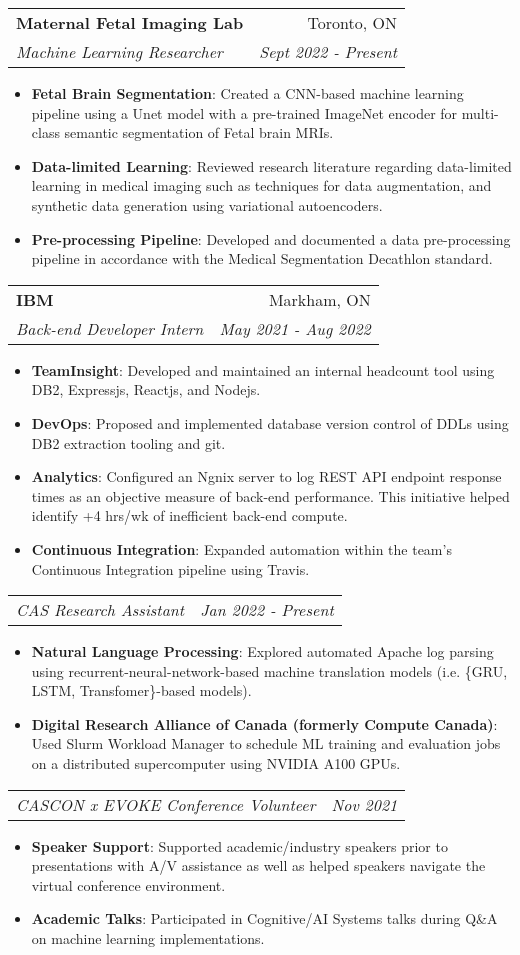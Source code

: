 \documentclass[letterpaper,11pt]{article}
\makeatletter
\newcommand{\resumeItem}[2]{
  \item\small{
    \textbf{#1}{: #2\vspace{-2pt}}
  }
}
\newcommand{\resumeSubheading}[4]{
  \vspace{-1pt}\item
    \begin{tabular*}{0.97\textwidth}[t]{l@{\extracolsep{\fill}}r}
      \textbf{\large#1} & #2 \\
      \textit{\small#3} & \textit{\small #4} \\
    \end{tabular*}\vspace{-5pt}
}
\newcommand{\resumeSubSubheading}[2]{
    \begin{tabular*}{0.97\textwidth}{l@{\extracolsep{\fill}}r}
      \textit{\small#1} & \textit{\small #2} \\
    \end{tabular*}\vspace{-5pt}
}
\newcommand{\resumeItemListStart}{\begin{itemize}}
\newcommand{\resumeItemListEnd}{\end{itemize}\vspace{-5pt}}
\makeatother
\begin{document}
	\resumeSubheading
	{Maternal Fetal Imaging Lab}{Toronto, ON}
	{Machine Learning Researcher}{Sept 2022 - Present}
	\resumeItemListStart
	\resumeItem{Fetal Brain Segmentation}
	{Created a CNN-based machine learning pipeline using a Unet model with a pre-trained ImageNet encoder for multi-class semantic segmentation of Fetal brain MRIs.}
	\resumeItem{Data-limited Learning}
	{Reviewed research literature regarding data-limited learning in medical imaging such as techniques for data augmentation, and synthetic data generation using variational autoencoders.}
	\resumeItem{Pre-processing Pipeline}
	{Developed and documented a data pre-processing pipeline in accordance with the Medical Segmentation Decathlon standard.}
	\resumeItemListEnd
	
    \resumeSubheading
      {IBM}{Markham, ON}
      {Back-end Developer Intern}{May 2021 - Aug 2022}
      \resumeItemListStart
        \resumeItem{TeamInsight}
          {Developed and maintained an internal headcount tool using DB2, Expressjs, Reactjs, and Nodejs.}
        \resumeItem{DevOps}
          {Proposed and implemented database version control of DDLs using DB2 extraction tooling and git.}
        \resumeItem{Analytics}
          {Configured an Ngnix server to log REST API endpoint response times as an objective measure of back-end performance. This initiative helped identify +4 hrs/wk of inefficient back-end compute.}
      	\resumeItem{Continuous Integration}
     	  {Expanded automation within the team's Continuous Integration pipeline using Travis.}
      \resumeItemListEnd
      \resumeSubSubheading
		{CAS Research Assistant}{Jan 2022 - Present}
		\resumeItemListStart
		\resumeItem{Natural Language Processing}
		{Explored automated Apache log parsing using recurrent-neural-network-based machine translation models (i.e. \{GRU, LSTM, Transfomer\}-based models).}
		\resumeItem{Digital Research Alliance of Canada (formerly Compute Canada)}
		{Used Slurm Workload Manager to schedule ML training and evaluation jobs on a distributed supercomputer using NVIDIA A100 GPUs.}
		\resumeItemListEnd
      \resumeSubSubheading
		{CASCON x EVOKE Conference Volunteer}{Nov 2021}
		\resumeItemListStart
		\resumeItem{Speaker Support}
		{Supported academic/industry speakers prior to presentations with A/V assistance as well as helped speakers navigate the virtual conference environment.}
		\resumeItem{Academic Talks}
		{Participated in Cognitive/AI Systems talks during Q\&A on machine learning implementations.}
		\resumeItemListEnd
      
\end{document}

